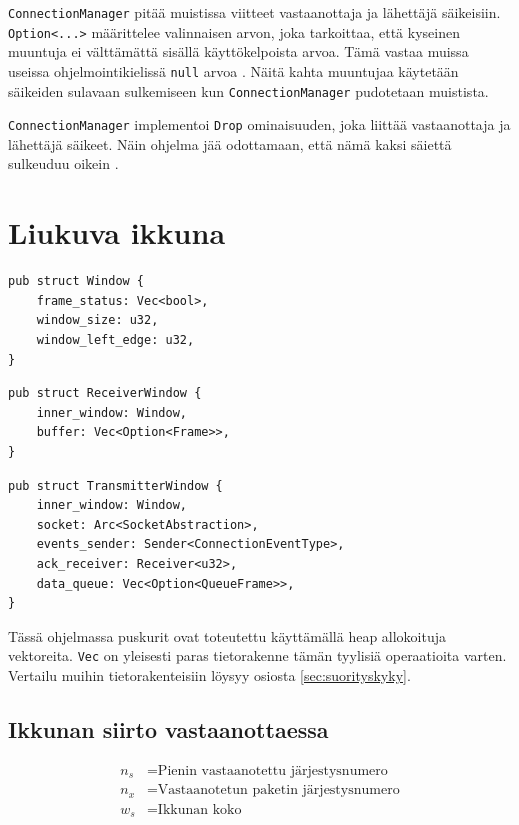 \documentclass[a4paper,12pt]{article}
\begin{document}
    \lstinline{ConnectionManager} pitää muistissa viitteet vastaanottaja ja lähettäjä säikeisiin.
    \lstinline{Option<...>} määrittelee valinnaisen arvon, joka tarkoittaa, että kyseinen muuntuja ei 
    välttämättä sisällä käyttökelpoista arvoa. Tämä vastaa muissa useissa ohjelmointikielissä \lstinline{null} arvoa \cite{rust_book_enum}. Näitä kahta muuntujaa käytetään säikeiden sulavaan sulkemiseen kun \lstinline{ConnectionManager} pudotetaan muistista. 

    \lstinline{ConnectionManager} implementoi \lstinline{Drop} ominaisuuden, joka liittää vastaanottaja
    ja lähettäjä säikeet. Näin ohjelma jää odottamaan, että nämä kaksi säiettä sulkeuduu oikein \cite{rust_doc_joinhandle}.
        
    \section{Liukuva ikkuna}\label{sec:liukuva_ikkuna}
    \begin{lstlisting}[caption={Ikkunan rakenne}, label={lst:window}]
pub struct Window {
    frame_status: Vec<bool>,
    window_size: u32,
    window_left_edge: u32,
}\end{lstlisting}


    \begin{lstlisting}[caption={Vastaanottajan ikkunan rakenne}, label={lst:rwindow}]
pub struct ReceiverWindow {
    inner_window: Window,
    buffer: Vec<Option<Frame>>,
}\end{lstlisting}

    \begin{lstlisting}[caption={Lähettävän ikkunan rakenne}, label={lst:twindow}]
pub struct TransmitterWindow {
    inner_window: Window,
    socket: Arc<SocketAbstraction>,
    events_sender: Sender<ConnectionEventType>,
    ack_receiver: Receiver<u32>,
    data_queue: Vec<Option<QueueFrame>>,
}\end{lstlisting}

Tässä ohjelmassa puskurit ovat toteutettu käyttämällä heap allokoituja vektoreita. \lstinline{Vec} on yleisesti paras tietorakenne tämän tyylisiä operaatioita varten. Vertailu muihin tietorakenteisiin löysyy osiosta \ref{sec:suorityskyky}.

    \subsection{Ikkunan siirto vastaanottaessa}

    \begin{align}
        n_s &= \text{Pienin vastaanotettu järjestysnumero} \\
        n_x &= \text{Vastaanotetun paketin järjestysnumero} \\
        w_s &= \text{Ikkunan koko}
    \end{align}
\end{document}
